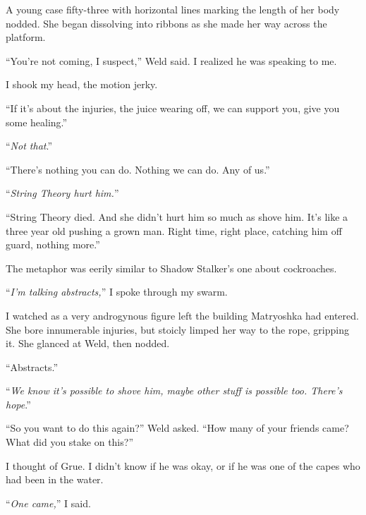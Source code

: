 A young case fifty-three with horizontal lines marking the length of her body nodded.  She began dissolving into ribbons as she made her way across the platform.



``You're not coming, I suspect,'' Weld said.  I realized he was speaking to me.



I shook my head, the motion jerky.



``If it's about the injuries, the juice wearing off, we can support you, give you some healing.''



``\emph{Not that}.''



``There's nothing you can do.  Nothing we can do.  Any of us.''



``\emph{String Theory hurt him.}''



``String Theory died.  And she didn't hurt him so much as shove him.  It's like a three year old pushing a grown man.  Right time, right place, catching him off guard, nothing more.''



The metaphor was eerily similar to Shadow Stalker's one about cockroaches.



``\emph{I'm talking abstracts,}'' I spoke through my swarm.



I watched as a very androgynous figure left the building Matryoshka had entered.  She bore innumerable injuries, but stoicly limped her way to the rope, gripping it.  She glanced at Weld, then nodded.



``Abstracts.''



``\emph{We know it's possible to shove him, maybe other stuff is possible too.  There's hope}.''



``So you want to do this again?'' Weld asked.  ``How many of your friends came?  What did you stake on this?''



I thought of Grue.  I didn't know if he was okay, or if he was one of the capes who had been in the water.



``\emph{One came,}'' I said.



